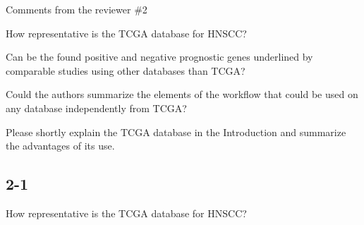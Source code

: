 \documentclass[preprint,12pt]{elsarticle}
\begin{document}
Comments from the reviewer \#2

How representative is the TCGA database for HNSCC?

Can be the found positive and negative prognostic genes underlined by comparable studies using other databases than TCGA?

Could the authors summarize the elements of the workflow that could be used on any database independently from TCGA?

Please shortly explain the TCGA database in the Introduction and summarize the advantages of its use.

\subsection*{2-1}
How representative is the TCGA database for HNSCC?
\end{document}
